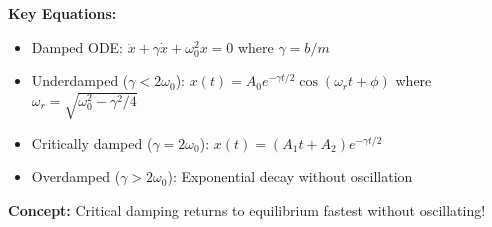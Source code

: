 \documentclass[11pt]{report}
\begin{document}
\begin{keybox}
\textbf{Key Equations:}
\begin{itemize}
    \item Damped ODE: $\ddot{x} + \gamma\dot{x} + \omega_0^2 x = 0$ where $\gamma = b/m$
    \item Underdamped ($\gamma < 2\omega_0$): $x(t) = A_0 e^{-\gamma t/2}\cos(\omega_r t + \phi)$ where $\omega_r = \sqrt{\omega_0^2 - \gamma^2/4}$
    \item Critically damped ($\gamma = 2\omega_0$): $x(t) = (A_1 t + A_2)e^{-\gamma t/2}$
    \item Overdamped ($\gamma > 2\omega_0$): Exponential decay without oscillation
\end{itemize}
\textbf{Concept:} Critical damping returns to equilibrium fastest without oscillating!
\end{keybox}
\end{document}
